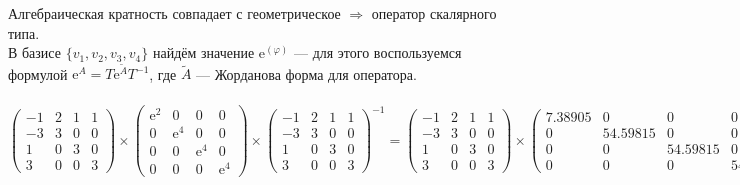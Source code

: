 \documentclass{article}
\newcommand{\e}{\text{e}}
\begin{document}
\begin{center}
Алгебраическая кратность совпадает с геометрическое $\Rightarrow$ оператор скалярного типа. \\
В базисе $\{v_1, v_2, v_3, v_4\}$ найдём значение $\e^{(\varphi)}$ --- для этого воспользуемся формулой $\e^A = T\e^{\tilde{A}}T^{-1}$, где $\tilde{A}$ --- Жорданова форма для оператора.
\end{center}
$$\begin{pmatrix}
-1 & 2 & 1 & 1 \\
-3 & 3 & 0 & 0 \\
1 & 0 & 3 & 0 \\
3 & 0 & 0 & 3
\end{pmatrix}\times \begin{pmatrix}
\e^2 & 0 & 0 & 0 \\
0 & \e^4 & 0 & 0 \\
0 & 0 & \e^4 & 0 \\
0 & 0 & 0 & \e^4
\end{pmatrix} \times \begin{pmatrix}
-1 & 2 & 1 & 1 \\
-3 & 3 & 0 & 0 \\
1 & 0 & 3 & 0 \\
3 & 0 & 0 & 3
\end{pmatrix}^{-1} = \begin{pmatrix}
-1 & 2 & 1 & 1 \\
-3 & 3 & 0 & 0 \\
1 & 0 & 3 & 0 \\
3 & 0 & 0 & 3
\end{pmatrix}\times \begin{pmatrix}
7.38905 & 0 & 0 & 0 \\
0 & 54.59815 & 0 & 0 \\
0 & 0 & 54.59815 & 0 \\
0 & 0 & 0 & 54.59815
\end{pmatrix} \times \begin{pmatrix}
-3 & 2 & 1 & 1 \\
-3 & \frac{2}{3} & 1 & 1 \\
1 & -\frac{2}{3} & 0 & -\frac{1}{3} \\
3 & -2 & -1 & -\frac{2}{3}
\end{pmatrix} =$$
\end{document}
